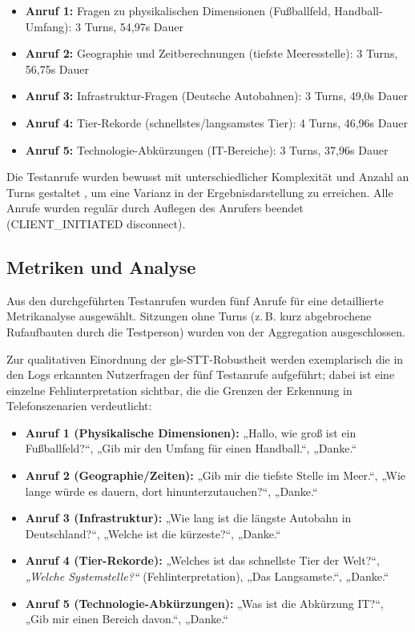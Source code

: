 \begin{itemize}
  \item \textbf{Anruf 1:} Fragen zu physikalischen Dimensionen (Fu\ss ballfeld, Handball-Umfang): 3 Turns, 54,97s Dauer
  \item \textbf{Anruf 2:} Geographie und Zeitberechnungen (tiefste Meeresstelle): 3 Turns, 56,75s Dauer
  \item \textbf{Anruf 3:} Infrastruktur-Fragen (Deutsche Autobahnen): 3 Turns, 49,0s Dauer
  \item \textbf{Anruf 4:} Tier-Rekorde (schnellstes/langsamstes Tier): 4 Turns, 46,96s Dauer
  \item \textbf{Anruf 5:} Technologie-Abkürzungen (IT-Bereiche): 3 Turns, 37,96s Dauer
\end{itemize}

Die Testanrufe wurden bewusst mit unterschiedlicher Komplexität und Anzahl an Turns gestaltet , um eine Varianz in der Ergebnisdarstellung zu erreichen. Alle Anrufe wurden regulär durch Auflegen des Anrufers beendet (CLIENT\_INITIATED disconnect).

\subsection{Metriken und Analyse}

Aus den durchgeführten Testanrufen wurden fünf Anrufe für eine detaillierte Metrikanalyse ausgewählt. Sitzungen ohne Turns (z.\,B. kurz abgebrochene Rufaufbauten durch die Testperson) wurden von der Aggregation ausgeschlossen.

Zur qualitativen Einordnung der \gls{gls-STT}-Robustheit werden exemplarisch die in den Logs erkannten Nutzerfragen der fünf Testanrufe aufgeführt; dabei ist eine einzelne Fehlinterpretation sichtbar, die die Grenzen der Erkennung in Telefonszenarien verdeutlicht:
\begin{itemize}
  \item \textbf{Anruf 1 (Physikalische Dimensionen):} „Hallo, wie groß ist ein Fu\ss ballfeld?“, „Gib mir den Umfang für einen Handball.“, „Danke.“
  \item \textbf{Anruf 2 (Geographie/Zeiten):} „Gib mir die tiefste Stelle im Meer.“, „Wie lange würde es dauern, dort hinunterzutauchen?“, „Danke.“
  \item \textbf{Anruf 3 (Infrastruktur):} „Wie lang ist die längste Autobahn in Deutschland?“, „Welche ist die kürzeste?“, „Danke.“
  \item \textbf{Anruf 4 (Tier-Rekorde):} „Welches ist das schnellste Tier der Welt?“, \textit{„Welche Systemstelle?“} (Fehlinterpretation), „Das Langsamste.“, „Danke.“
  \item \textbf{Anruf 5 (Technologie-Abkürzungen):} „Was ist die Abkürzung IT?“, „Gib mir einen Bereich davon.“, „Danke.“
\end{itemize}

